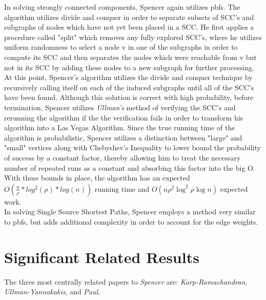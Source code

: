 \documentclass[paper=a4, fontsize=11pt]{scrartcl} %
\numberwithin{equation}{section} %
\numberwithin{figure}{section} %
\numberwithin{table}{section} %
\begin{document}
In solving strongly connected components, Spencer again utilizes pbfs. The algorithm utilizes divide and conquer in order to separate subsets of SCC's and subgraphs of nodes which have not yet been placed in a SCC. He first applies a procedure called "split" which removes any fully explored SCC's, where he utilizes uniform randomness to select a node v in one of the subgraphs in order to compute its SCC and then separates the nodes which were reachable from v but not in its SCC by adding these nodes to a new subgraph for further processing. At this point, Spencer's algorithm utilizes the divide and conquer technique by recursively calling itself on each of the induced subgraphs until all of the SCC's have been found. Although this solution is correct with high probability, before termination, Spencer utilizes \textit{Ullman's\cite{UY91}} method of verifying the SCC's and rerunning the algorithm if the the verification fails in order to transform his algorithm into a Las Vegas Algorithm. Since the true running time of the algorithm is probabilistic, Spencer utilizes a distinction between "large" and "small" vertices along with Chebyshev's Inequality to lower bound the probability of success by a constant factor, thereby allowing him to treat the necessary number of repeated runs as a constant and absorbing this factor into the big O. With these bounds in place, the algorithm has an expected $O(\frac{n}{\rho}*log^2(\rho)*log(n))$ running time and $O(n\rho^2\log^2{\rho}\log{n})$ expected work.  \\

In solving Single Source Shortest Paths, Spencer employs a method very similar to pbfs, but adds additional complexity in order to account for the edge weights. 


\section{Significant Related Results}

The three most centrally related papers to \textit{Spencer\cite{S97}} are:  \textit{Karp-Ramachandran\cite{KR90}}, \textit{Ullman-Yannakakis\cite{UY91}}, and \textit{Paul\cite{P83}}.
\end{document}
